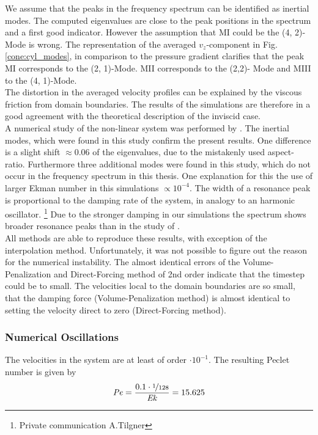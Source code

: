 We assume that the peaks in the frequency spectrum can be identified as inertial modes.
The computed eigenvalues  are close to the peak positions in the spectrum and a first good indicator.
However  the assumption that M\RN{1} could be the (4, 2)-Mode is wrong.
The representation of the averaged $v_z$-component in Fig. \ref{cone:cyl_modes}, in comparison to the pressure gradient
clarifies that the peak M\RN{1} corresponds to the (2, 1)-Mode.
M\RN{2} corresponds to the (2,2)- Mode and M\RN{3}  to the (4, 1)-Mode.\\
The distortion in the averaged velocity profiles can be explained by the viscous friction from domain boundaries.
The results of the simulations are therefore in a good agreement with the theoretical description of the inviscid case.
\\
A numerical study of the non-linear system was performed by \citep{Sauret2012}.
The inertial modes, which were found in this study confirm the present results.
One difference is a slight shift $\approx0.06$ of the eigenvalues,
due to the mistakenly used aspect-ratio.
Furthermore three additional modes were found in this study, which do not occur
in the frequency spectrum in this thesis.
One explanation for this the use of larger Ekman number in this simulations $\propto10^{-4}$.
The width of a resonance peak is proportional to the damping rate of the system, in analogy to an harmonic oscillator.
\footnote{Private communication A.Tilgner}
Due to the stronger damping in our simulations the spectrum shows broader resonance peaks than in the study of \citep{Sauret2012}.\\
All methods are able to reproduce these results, with exception of the interpolation method.
Unfortunately, it was not possible to figure out the reason for the numerical instability.
The almost identical errors of the Volume-Penalization and Direct-Forcing method of 2nd order
indicate that the timestep could be to small.
The velocities local to the domain boundaries are so small, that the damping force (Volume-Penalization method) is almost identical
to setting the velocity direct to zero (Direct-Forcing method).

\subsubsection{Numerical Oscillations}

The velocities in the system are at least of order $\cdot10^{-1}$. The resulting Peclet number is
given by
\begin{align}
    \mbox{\textit{Pe}} = \frac{0.1\cdot\nicefrac{1}{128}}{\mbox{\textit{Ek}}} =15.625
\end{align}

